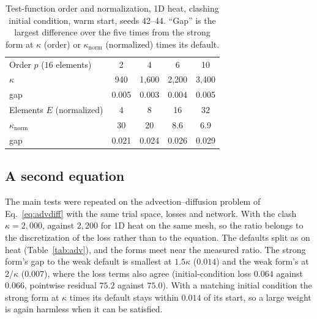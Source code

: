 \documentclass[a4paper,fleqn]{cas-sc}
\begin{document}
\begin{table}[htbp]
\centering
\caption{Test-function order and normalization, 1D heat, clashing initial condition, warm start, seeds 42--44. ``Gap''
is the largest difference over the five times from the strong form at $\kappa$ (order) or $\kappa_{\mathrm{norm}}$
(normalized) times its default.}
\label{tab:order}
\small
\begin{tabular}{lcccc}
\toprule
Order $p$ ($16$ elements) & 2 & 4 & 6 & 10 \\
$\kappa$ & 940 & 1{,}600 & 2{,}200 & 3{,}400 \\
gap & 0.005 & 0.003 & 0.004 & 0.005 \\
\midrule
Elements $E$ (normalized) & 4 & 8 & 16 & 32 \\
$\kappa_{\mathrm{norm}}$ & 30 & 20 & 8.6 & 6.9 \\
gap & 0.021 & 0.024 & 0.026 & 0.029 \\
\bottomrule
\end{tabular}
\end{table}

\subsection{A second equation}
\label{sec:advdiff}

The main tests were repeated on the advection--diffusion problem of Eq.~\eqref{eq:advdiff} with the same trial space,
losses and network. With the clash $\kappa=2{,}000$, against $2{,}200$ for 1D heat on the same mesh, so the ratio belongs
to the discretization of the loss rather than to the equation. The defaults split as on heat (Table~\ref{tab:adv}), and
the forms meet near the measured ratio. The strong form's gap to the weak default is smallest at $1.5\kappa$ ($0.014$)
and the weak form's at $2/\kappa$ ($0.007$), where the loss terms also agree (initial-condition loss $0.064$ against
$0.066$, pointwise residual $75.2$ against $75.0$). With a matching initial condition the strong form at $\kappa$ times its
default stays within $0.014$ of its start, so a large weight is again harmless when it can be satisfied.
\end{document}
